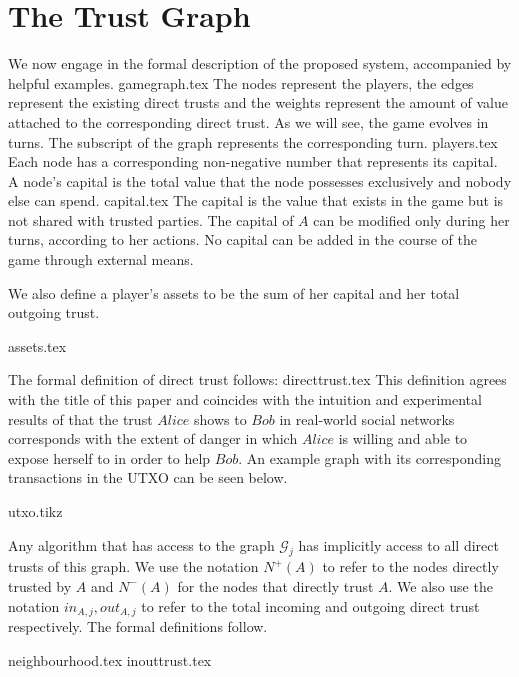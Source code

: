 \section{The Trust Graph}
   We now engage in the formal description of the proposed system, accompanied by helpful examples.
   {gamegraph.tex}
   The nodes represent the players, the edges represent the existing direct trusts and the weights represent the amount of
   value attached to the corresponding direct trust. As we will see, the game evolves in turns. The subscript of the graph
   represents the corresponding turn.
   {players.tex}
   Each node has a corresponding non-negative number that represents its capital. A node's capital is the total value that
   the node possesses exclusively and nobody else can spend.
   {capital.tex}
   The capital is the value that exists in the game but is not shared with trusted parties. The capital of $A$ can be
   modified only during her turns, according to her actions. No capital can be added in the course of the game through
   external means.

   We also define a player's assets to be the sum of her capital and her total outgoing trust.

   {assets.tex}

   The formal definition of direct trust follows:
   {directtrust.tex}
   This definition agrees with the title of this paper and coincides with the intuition and experimental results of
   \cite{kmrs} that the trust $Alice$ shows to $Bob$ in real-world social networks corresponds with the extent
   of danger in which $Alice$ is willing and able to expose herself to in order to help $Bob$. An example graph with its
   corresponding transactions in the UTXO can be seen below.

   {utxo.tikz}

   Any algorithm that has access to the graph $\mathcal{G}_j$ has implicitly access to all direct trusts of this graph.
   We use the notation $N^{+}(A)$ to refer to the nodes directly trusted by $A$ and $N^{-}(A)$ for the nodes that directly
   trust $A$. We also use the notation $in_{A, j}, out_{A, j}$ to refer to the total incoming and outgoing direct trust
   respectively. The formal definitions follow. %

   {neighbourhood.tex}
   {inouttrust.tex}
